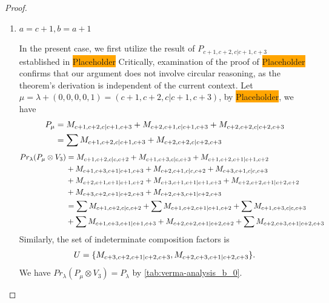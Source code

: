 \begin{proof}
\begin{enumerate}
\begin{enumerate}
      \item $a=c+1,b=a+1$ \par
        In the present case, we first utilize the result of $P_{c+1,c+2,c|c+1,c+3}$ established in \colorbox{orange}{Placeholder} Critically, examination of the proof of \colorbox{orange}{Placeholder} confirms that our argument does not involve circular reasoning, as the theorem's derivation is independent of the current context. Let $\mu = \lambda + (0,0,0,0,1) =(c+1,c+2,c|c+1,c+3) $, by \colorbox{orange}{Placeholder}, we have
        \begin{equation}\notag
          \begin{aligned}
            P_{\mu} &= M_{c+1,c+2,c|c+1,c+3}
+M_{c+2,c+1,c|c+1,c+3}
+M_{c+2,c+2,c|c+2,c+3} \\
                    &=
\sum M_{c+1,c+2,c|c+1,c+3}
+ M_{c+2,c+2,c|c+2,c+3}
          \end{aligned}
        \end{equation}
        \begin{equation}\notag
          \begin{aligned}
            Pr_{\lambda}(P_\mu \otimes V_{3}) &=
M_{c+1,c+2,c|c,c+2}
+ M_{c+1,c+3,c|c,c+3}
+ M_{c+1,c+2,c+1|c+1,c+2}\\
                                              &
+ M_{c+1,c+3,c+1|c+1,c+3}
+ M_{c+2,c+1,c|c,c+2}
+ M_{c+3,c+1,c|c,c+3}\\
                                              &
+ M_{c+2,c+1,c+1|c+1,c+2}
+ M_{c+3,c+1,c+1|c+1,c+3}
+ M_{c+2,c+2,c+1|c+2,c+2}\\
                                              &
+ M_{c+3,c+2,c+1|c+2,c+3}
+ M_{c+2,c+3,c+1|c+2,c+3} \\
                                               &=
\sum M_{c+1,c+2,c|c,c+2}
+ \sum M_{c+1,c+2,c+1|c+1,c+2}
+ \sum M_{c+1,c+3,c|c,c+3}\\
                                              &
+ \sum M_{c+1,c+3,c+1|c+1,c+3}
+  M_{c+2,c+2,c+1|c+2,c+2}
+ \sum M_{c+2,c+3,c+1|c+2,c+3}
          \end{aligned}
        \end{equation}
      Similarly, the set of indeterminate composition factors is 
\begin{equation}\notag
  \begin{aligned}
    U = \{
M_{c+3,c+2,c+1|c+2,c+3},
M_{c+2,c+3,c+1|c+2,c+3}
\}.
  \end{aligned}
\end{equation}
       We have $Pr_{\lambda}(P_\mu \otimes V_{3}) = P_\lambda  $ by \cref{tab:verma-analysis_b_0}.

\end{enumerate}
\end{enumerate}
\end{proof}
